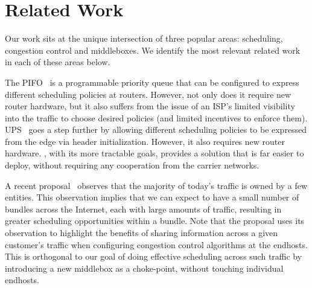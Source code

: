 \section{Related Work}
\label{s:related}

Our work sits at the unique intersection of three popular areas: scheduling, congestion control and middleboxes. We identify the most relevant related work in each of these areas below. 

 The PIFO~\cite{pifo} is a programmable priority queue that can be configured to express different scheduling policies at routers. However, not only does it require new router hardware, but it also suffers from the issue of an ISP's limited visibility into the traffic to choose desired policies (and limited incentives to enforce them). UPS~\cite{ups} goes a step further by allowing different scheduling policies to be expressed from the edge via header initialization. 
However, it also requires new router hardware. \name, with its more tractable goals, provides a solution that is far easier to deploy, without requiring any cooperation from the carrier networks. 

 A recent proposal~\cite{fivecomps} observes that the majority of today's traffic is owned by a few entities.
This observation implies that we can expect to have a small number of bundles across the Internet, each with large amounts of traffic, resulting in greater scheduling opportunities within a bundle. Note that the proposal uses its observation to highlight the benefits of sharing information across a given customer's traffic when configuring congestion control algorithms at the endhosts. This is orthogonal to our goal of doing effective scheduling across such traffic by introducing a new middlebox as a choke-point, without touching individual endhosts. 

